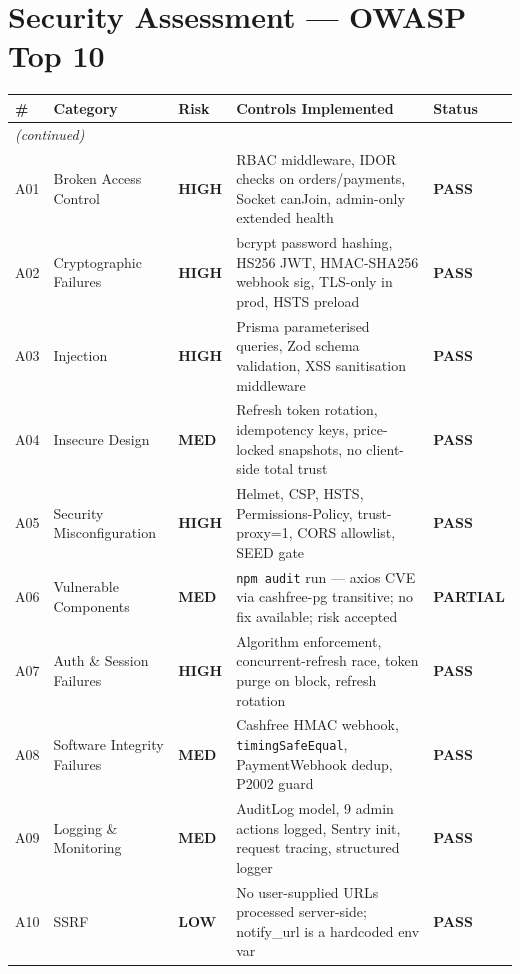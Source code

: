 \documentclass[11pt,a4paper]{article}
\newcommand{\PASS}{\colorbox{successgreen!20}{\color{successgreen}\bfseries\small PASS}}
\newcommand{\PARTIAL}{\colorbox{warnyellow!20}{\color{warnyellow}\bfseries\small PARTIAL}}
\newcommand{\HIGH}{\colorbox{dangerred!20}{\color{dangerred}\bfseries\tiny HIGH}}
\newcommand{\MEDIUM}{\colorbox{warnyellow!20}{\color{warnyellow}\bfseries\tiny MED}}
\newcommand{\LOW}{\colorbox{successgreen!20}{\color{successgreen}\bfseries\tiny LOW}}
\begin{document}
\section{Security Assessment — OWASP Top 10}

\begin{longtable}{@{}p{0.5cm}p{4.5cm}p{2cm}p{5cm}p{1.5cm}@{}}
\toprule
\rowcolor{navyblue}
\color{white}\bfseries\# & \color{white}\bfseries Category & \color{white}\bfseries Risk & \color{white}\bfseries Controls Implemented & \color{white}\bfseries Status \\
\midrule
\endfirsthead
\midrule
\multicolumn{5}{l}{\small\itshape (continued)} \\
\midrule
\endhead
\bottomrule
\endfoot

A01 & Broken Access Control &
  \HIGH &
  RBAC middleware, IDOR checks on orders/payments, Socket canJoin, admin-only extended health &
  \PASS \\
\rowcolor{rowalt}
A02 & Cryptographic Failures &
  \HIGH &
  bcrypt password hashing, HS256 JWT, HMAC-SHA256 webhook sig, TLS-only in prod, HSTS preload &
  \PASS \\
A03 & Injection &
  \HIGH &
  Prisma parameterised queries, Zod schema validation, XSS sanitisation middleware &
  \PASS \\
\rowcolor{rowalt}
A04 & Insecure Design &
  \MEDIUM &
  Refresh token rotation, idempotency keys, price-locked snapshots, no client-side total trust &
  \PASS \\
A05 & Security Misconfiguration &
  \HIGH &
  Helmet, CSP, HSTS, Permissions-Policy, trust-proxy=1, CORS allowlist, SEED gate &
  \PASS \\
\rowcolor{rowalt}
A06 & Vulnerable Components &
  \MEDIUM &
  \texttt{npm audit} run — axios CVE via cashfree-pg transitive; no fix available; risk accepted &
  \PARTIAL \\
A07 & Auth \& Session Failures &
  \HIGH &
  Algorithm enforcement, concurrent-refresh race, token purge on block, refresh rotation &
  \PASS \\
\rowcolor{rowalt}
A08 & Software Integrity Failures &
  \MEDIUM &
  Cashfree HMAC webhook, \texttt{timingSafeEqual}, PaymentWebhook dedup, P2002 guard &
  \PASS \\
A09 & Logging \& Monitoring &
  \MEDIUM &
  AuditLog model, 9 admin actions logged, Sentry init, request tracing, structured logger &
  \PASS \\
\rowcolor{rowalt}
A10 & SSRF &
  \LOW &
  No user-supplied URLs processed server-side; notify\_url is a hardcoded env var &
  \PASS \\
\end{longtable}
\end{document}
